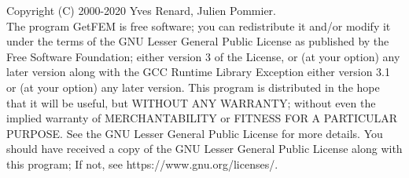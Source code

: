 Copyright (C) 2000-2020 Yves Renard, Julien Pommier.\\
The program GetFEM is free software; you can redistribute it and/or modify
it under the terms of the GNU Lesser General Public License as published by
the Free Software Foundation; either version 3 of the License, or
(at your option) any later version along with the GCC Runtime Library
Exception either version 3.1 or (at your option) any later version.
This program is distributed in the hope that it will be useful,
but WITHOUT ANY WARRANTY; without even the implied warranty of
MERCHANTABILITY or FITNESS FOR A PARTICULAR PURPOSE.  See the
GNU Lesser General Public License for more details.
You should have received a copy of the GNU  Lesser General Public License
along with this program; If not, see https://www.gnu.org/licenses/.